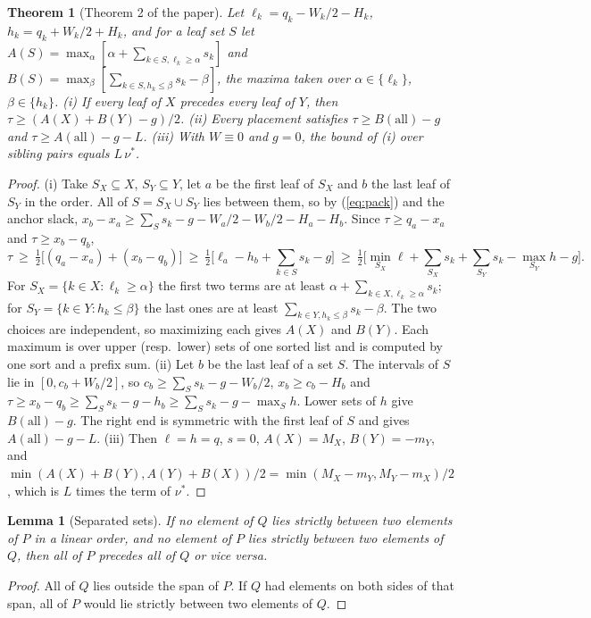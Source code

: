 \documentclass[10pt]{article}
\newtheorem{lemma}{Lemma}
\newtheorem{theorem}{Theorem}
\begin{document}
\begin{theorem}[Theorem 2 of the paper]
Let $\ell_k=q_k-W_k/2-H_k$, $h_k=q_k+W_k/2+H_k$, and for a leaf set $S$ let $A(S)=\max_\alpha[\alpha+\sum_{k\in S,\ell_k\ge\alpha}s_k]$ and $B(S)=\max_\beta[\sum_{k\in S,h_k\le\beta}s_k-\beta]$, the maxima taken over $\alpha\in\{\ell_k\}$, $\beta\in\{h_k\}$. (i) If every leaf of $X$ precedes every leaf of $Y$, then $\tau\ge(A(X)+B(Y)-g)/2$. (ii) Every placement satisfies $\tau\ge B(\mathrm{all})-g$ and $\tau\ge A(\mathrm{all})-g-L$. (iii) With $W\equiv0$ and $g=0$, the bound of (i) over sibling pairs equals $L\,\nu^*$.
\end{theorem}
\begin{proof}
(i) Take $S_X\subseteq X$, $S_Y\subseteq Y$, let $a$ be the first leaf of $S_X$ and $b$ the last leaf of $S_Y$ in the order. All of $S=S_X\cup S_Y$ lies between them, so by (\ref{eq:pack}) and the anchor slack, $x_b-x_a\ge\sum_S s_k-g-W_a/2-W_b/2-H_a-H_b$. Since $\tau\ge q_a-x_a$ and $\tau\ge x_b-q_b$,
\[
\tau\ \ge\ \tfrac12\big[(q_a-x_a)+(x_b-q_b)\big]\ \ge\ \tfrac12\Big[\ell_a-h_b+\sum_{k\in S}s_k-g\Big]\ \ge\ \tfrac12\Big[\min_{S_X}\ell+\sum_{S_X}s_k+\sum_{S_Y}s_k-\max_{S_Y}h-g\Big].
\]
For $S_X=\{k\in X:\ell_k\ge\alpha\}$ the first two terms are at least $\alpha+\sum_{k\in X,\ell_k\ge\alpha}s_k$; for $S_Y=\{k\in Y:h_k\le\beta\}$ the last ones are at least $\sum_{k\in Y,h_k\le\beta}s_k-\beta$. The two choices are independent, so maximizing each gives $A(X)$ and $B(Y)$. Each maximum is over upper (resp.\ lower) sets of one sorted list and is computed by one sort and a prefix sum.
(ii) Let $b$ be the last leaf of a set $S$. The intervals of $S$ lie in $[0,c_b+W_b/2]$, so $c_b\ge\sum_S s_k-g-W_b/2$, $x_b\ge c_b-H_b$ and $\tau\ge x_b-q_b\ge\sum_S s_k-g-h_b\ge\sum_S s_k-g-\max_S h$. Lower sets of $h$ give $B(\mathrm{all})-g$. The right end is symmetric with the first leaf of $S$ and gives $A(\mathrm{all})-g-L$.
(iii) Then $\ell=h=q$, $s=0$, $A(X)=M_X$, $B(Y)=-m_Y$, and $\min(A(X)+B(Y),A(Y)+B(X))/2=\min(M_X-m_Y,M_Y-m_X)/2$, which is $L$ times the term of $\nu^*$.
\end{proof}

\begin{lemma}[Separated sets]\label{lem:sets}
If no element of $Q$ lies strictly between two elements of $P$ in a linear order, and no element of $P$ lies strictly between two elements of $Q$, then all of $P$ precedes all of $Q$ or vice versa.
\end{lemma}
\begin{proof}
All of $Q$ lies outside the span of $P$. If $Q$ had elements on both sides of that span, all of $P$ would lie strictly between two elements of $Q$.
\end{proof}
\end{document}
